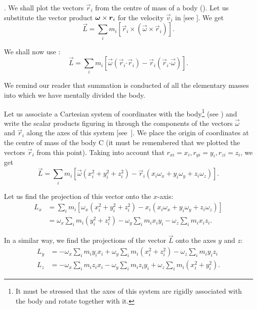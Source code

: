 . We shall plot the vectors $\vec{r}_i$ from the centre of mass of a body (). Let us substitute the vector product $\boldsymbol{\omega}\times\boldsymbol{r}_i$ for the velocity $\vec{v}_i$ in  [see ]. We get
\begin{equation*}
\vec{L} = \sum_i m_i [\vec{r}_i \times (\vec{\omega} \times \vec{r}_i)].
\end{equation*}

\noindent
We shall now use :
\begin{equation}\label{eq:5_36}
\vec{L} = \sum_i m_i [\vec{\omega}(\vec{r}_i\boldsymbol{\cdot}\vec{r}_i) - \vec{r}_i(\vec{r}_i\boldsymbol{\cdot}\vec{\omega})].
\end{equation}

\noindent
We remind our reader that summation is conducted of all the elementary masses into which we have mentally divided the body.

Let us associate a Cartesian system of coordinates with the body\footnote{It must be stressed that the axes of this system are rigidly associated with the body and rotate together with it.} (see ) and write the scalar products figuring in  through the components of the vectors $\vec{\omega}$ and $\vec{r}_i$ along the axes of this system [see~]. We place the origin of coordinates at the centre of mass of the body C (it must be remembered that we plotted the vectors $\vec{r}_i$ from this point). Taking into account that $r_{xi}=x_i, r_{yi}=y_i, r_{zi}=z_i$, we get
\begin{equation}\label{eq:5_37}
\vec{L} = \sum_i m_i [\vec{\omega}(x_i^2+y_i^2+z_i^2) - \vec{r}_i(x_i\omega_x+y_i\omega_y+z_i\omega_z)].
\end{equation}

\noindent
Let us find the projection of this vector onto the $x$-axis:
\begin{align}
L_x &= \sum_i m_i [\omega_x(x_i^2+y_i^2+z_i^2) - x_i(x_i\omega_x+y_i\omega_y+z_i\omega_z)] \nonumber\\
&= \omega_x\sum_i m_i(y_i^2+z_i^2) - \omega_y\sum_i m_i x_i y_i - \omega_z\sum_i m_i x_i z_i.\label{eq:5_38}
\end{align}

\noindent
In a similar way, we find the projections of the vector $\vec{L}$ onto the axes $y$ and $z$:
\begin{align}
L_y &= -\omega_x\sum_i m_i y_i x_i + \omega_y\sum_i m_i (x_i^2+z_i^2) - \omega_z\sum_i m_i y_i z_i \label{eq:5_39}\\
L_z &= -\omega_x\sum_i m_i z_i x_i - \omega_y\sum_i m_i z_i y_i + \omega_z\sum_i m_i (x_i^2+y_i^2). \label{eq:5_40}
\end{align}

